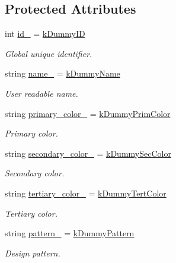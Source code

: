 \subsection*{Protected Attributes}
\begin{DoxyCompactItemize}
\item 
int \mbox{\hyperlink{classClothes_a8978d931db5ca47c3ccea30def4ae83e}{id\+\_\+}} = \mbox{\hyperlink{clothes_8h_a77186917343a417a2369cdff0bc86d31}{k\+Dummy\+ID}}
\begin{DoxyCompactList}\small\item\em Global unique identifier. \end{DoxyCompactList}\item 
string \mbox{\hyperlink{classClothes_a7f2275aaae24224d60c48af922c31b65}{name\+\_\+}} = \mbox{\hyperlink{clothes_8h_adba739b5125fd5a4066ec0ef063c0657}{k\+Dummy\+Name}}
\begin{DoxyCompactList}\small\item\em User readable name. \end{DoxyCompactList}\item 
string \mbox{\hyperlink{classClothes_a7cb005bf6cbb7f4eaa40f1b31817559c}{primary\+\_\+color\+\_\+}} = \mbox{\hyperlink{clothes_8h_a1b9c685d3bf2811d95b65e0d396c1344}{k\+Dummy\+Prim\+Color}}
\begin{DoxyCompactList}\small\item\em Primary color. \end{DoxyCompactList}\item 
string \mbox{\hyperlink{classClothes_ab8f55f67b956b25d71260cffcf273673}{secondary\+\_\+color\+\_\+}} = \mbox{\hyperlink{clothes_8h_a71c39811135425d881af7760da63a73a}{k\+Dummy\+Sec\+Color}}
\begin{DoxyCompactList}\small\item\em Secondary color. \end{DoxyCompactList}\item 
string \mbox{\hyperlink{classClothes_a3c5f1e7ab531e3ba7a38b930da8078a0}{tertiary\+\_\+color\+\_\+}} = \mbox{\hyperlink{clothes_8h_a094dde85547895fd70dafb3ab10c6783}{k\+Dummy\+Tert\+Color}}
\begin{DoxyCompactList}\small\item\em Tertiary color. \end{DoxyCompactList}\item 
string \mbox{\hyperlink{classClothes_a1d40145a4eb6d28441f112f030ab5d35}{pattern\+\_\+}} = \mbox{\hyperlink{clothes_8h_a2e72ae4d77adb7bc9cbecf4dea1e9e22}{k\+Dummy\+Pattern}}
\begin{DoxyCompactList}\small\item\em Design pattern. \end{DoxyCompactList}\item 

\end{DoxyCompactItemize}
